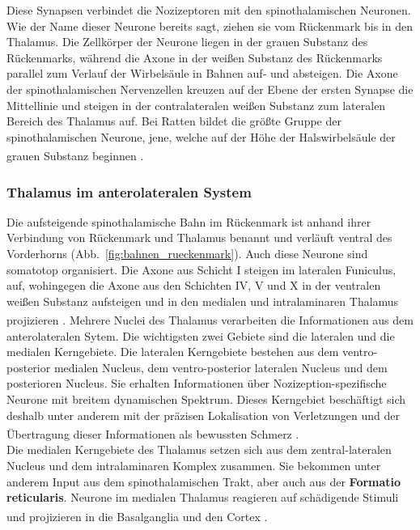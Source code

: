 \newpage
Diese Synapsen verbindet die Nozizeptoren mit den spinothalamischen Neuronen. Wie der Name dieser Neurone bereits sagt, ziehen sie vom Rückenmark bis in den Thalamus. Die Zellkörper der Neurone liegen in der grauen Substanz des Rückenmarks, während die Axone in der weißen Substanz des Rückenmarks parallel zum Verlauf der Wirbelsäule in Bahnen auf- und absteigen. Die Axone der spinothalamischen Nervenzellen kreuzen auf der Ebene der ersten Synapse die Mittellinie und steigen in der contralateralen weißen Substanz zum lateralen Bereich des Thalamus auf. Bei Ratten bildet die größte Gruppe der spinothalamischen Neurone, jene, welche auf der Höhe der Halswirbelsäule der grauen Substanz beginnen \textsuperscript{\cite[Kap.~25]{paxinos2014rat}}.


\subsubsection*{Thalamus im anterolateralen System}
Die aufsteigende spinothalamische Bahn  im Rückenmark ist anhand ihrer Verbindung von Rückenmark und Thalamus benannt und verläuft ventral des Vorderhorns  (Abb.~\ref{fig:bahnen_rueckenmark}). Auch diese Neurone sind somatotop organisiert. Die Axone aus Schicht I steigen im lateralen Funiculus, auf, wohingegen die Axone aus den Schichten IV, V und X in der ventralen weißen Substanz aufsteigen und in den medialen und intralaminaren Thalamus projizieren \textsuperscript{\cite[Kap.~25]{paxinos2014rat}}. 
Mehrere Nuclei des Thalamus verarbeiten die Informationen aus dem anterolateralen Sytem. Die wichtigsten zwei Gebiete sind die lateralen und die medialen Kerngebiete. 
Die lateralen Kerngebiete bestehen aus dem ventro-posterior medialen Nucleus, dem ventro-posterior lateralen Nucleus und dem posterioren Nucleus. Sie erhalten Informationen über Nozizeption-spezifische Neurone mit breitem dynamischen Spektrum. Dieses Kerngebiet beschäftigt sich deshalb unter anderem mit der präzisen Lokalisation von Verletzungen und der Übertragung dieser Informationen als bewussten Schmerz \textsuperscript{\cite[Kap.~24]{kandel2013principles}}.
\\
\noindent Die medialen Kerngebiete des Thalamus setzen sich aus dem zentral-lateralen Nucleus und dem intralaminaren Komplex zusammen. Sie bekommen unter anderem Input aus dem spinothalamischen Trakt, aber auch aus der \textbf{Formatio reticularis}. Neurone im medialen Thalamus reagieren auf schädigende Stimuli und projizieren in die Basalganglia und den Cortex \textsuperscript{\cite[Kap.~24]{kandel2013principles}}.

